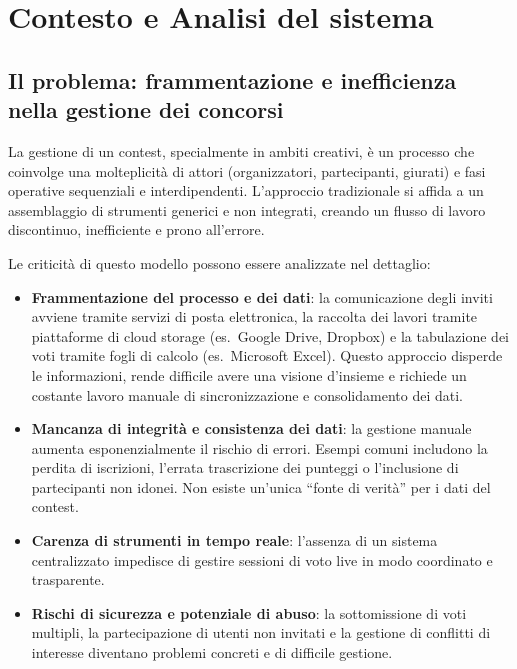
\chapter{Contesto e Analisi del sistema}\label{ch:contesto-e-analisi-del-sistema}


\section{Il problema: frammentazione e inefficienza nella gestione dei concorsi}\label{sec:il-problema:-frammentazione-e-inefficienza-nella-gestione-dei-concorsi}
La gestione di un contest, specialmente in ambiti creativi, è un processo che coinvolge una molteplicità di attori (organizzatori, partecipanti, giurati) e fasi operative sequenziali e interdipendenti.
L'approccio tradizionale si affida a un assemblaggio di strumenti generici e non integrati, creando un flusso di lavoro discontinuo, inefficiente e prono all'errore.

Le criticità di questo modello possono essere analizzate nel dettaglio:
\begin{itemize}
    \item \textbf{Frammentazione del processo e dei dati}: la comunicazione degli inviti avviene tramite servizi di posta elettronica, la raccolta dei lavori tramite piattaforme di cloud storage (es.\ Google Drive, Dropbox) e la tabulazione dei voti tramite fogli di calcolo (es.\ Microsoft Excel).
    Questo approccio disperde le informazioni, rende difficile avere una visione d'insieme e richiede un costante lavoro manuale di sincronizzazione e consolidamento dei dati.
    \item \textbf{Mancanza di integrità e consistenza dei dati}: la gestione manuale aumenta esponenzialmente il rischio di errori.
    Esempi comuni includono la perdita di iscrizioni, l'errata trascrizione dei punteggi o l'inclusione di partecipanti non idonei.
    Non esiste un'unica ``fonte di verità'' per i dati del contest.
    \item \textbf{Carenza di strumenti in tempo reale}: l'assenza di un sistema centralizzato impedisce di gestire sessioni di voto live in modo coordinato e trasparente.
    \item \textbf{Rischi di sicurezza e potenziale di abuso}: la sottomissione di voti multipli, la partecipazione di utenti non invitati e la gestione di conflitti di interesse diventano problemi concreti e di difficile gestione.
\end{itemize}

